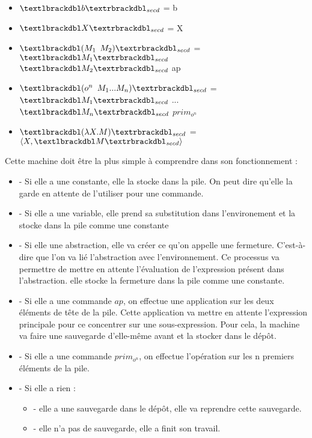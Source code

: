 \documentclass[10pt,a4paper]{article}
\begin{document}
				\begin{itemize}
					\item[] $\textlbrackdbl b\textrbrackdbl _{secd}$ = b
					\item[] $\textlbrackdbl X\textrbrackdbl _{secd}$ = X
					\item[] $\textlbrackdbl (M_{1}$ $M_{2})\textrbrackdbl _{secd}$ = $\textlbrackdbl M_{1}\textrbrackdbl _{secd}$ $\textlbrackdbl M_{2}\textrbrackdbl _{secd}$ ap
					\item[] $\textlbrackdbl (o^{n}$ $M_{1}...M_{n})\textrbrackdbl _{secd}$ = $\textlbrackdbl M_{1}\textrbrackdbl _{secd}$ $...$ $\textlbrackdbl M_{n}\textrbrackdbl _{secd}$ $prim_{o^{n}}$
					\item[]  $\textlbrackdbl(\lambda X.M)\textrbrackdbl _{secd}$ =  $\langle X,\textlbrackdbl M\textrbrackdbl _{secd}\rangle$
				\end{itemize}
				\bigbreak
				
				
				Cette machine doit être la plus simple à comprendre dans son fonctionnement :
				\begin{itemize}
					\item[] - Si elle a une constante, elle la stocke dans la pile. On peut dire qu'elle la garde en attente de l'utiliser pour une commande. 
					\item[] - Si elle a une variable, elle prend sa substitution dans l'environement et la stocke dans la pile comme une constante
					\item[] - Si elle une abstraction, elle va créer ce qu'on appelle une fermeture. C'est-à-dire que l'on va lié l'abstraction avec l'environnement. Ce processus va permettre de mettre en attente l'évaluation de l'expression présent dans l'abstraction. elle stocke la fermeture dans la pile comme une constante.
					\item[] - Si elle a une commande $ap$, on effectue une application sur les deux éléments de tête de la pile. Cette application va mettre en attente l'expression principale pour ce concentrer sur une sous-expression. Pour cela, la machine va faire une sauvegarde d'elle-même avant et la stocker dans le dépôt.
					\item[] - Si elle a une commande $prim_{o^{n}}$, on effectue l'opération sur les n premiers éléments de la pile.
					\item[] - Si elle a rien :
					\begin{itemize}
						\item[] - elle a une sauvegarde dans le dépôt, elle va reprendre cette sauvegarde.
						\item[] - elle n'a pas de sauvegarde, elle a finit son travail.
					\end{itemize}
				\end{itemize}
				\bigbreak
				
\end{document}
